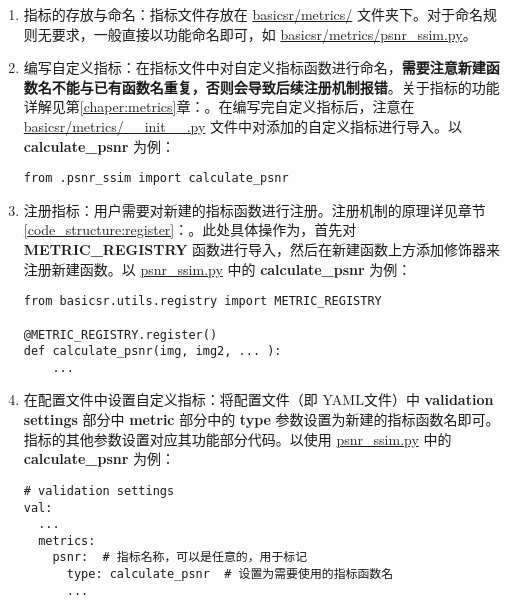 \documentclass[../main.tex]{subfiles}
\begin{document}
\begin{enumerate}[第 1 步]
    \item 指标的存放与命名：指标文件存放在 \href{https://github.com/XPixelGroup/BasicSR/tree/master/basicsr/metrics}{basicsr/metrics/} 文件夹下。对于命名规则无要求，一般直接以功能命名即可，如 \href{https://github.com/XPixelGroup/BasicSR/tree/master/basicsr/metrics/psnr_ssim.py}{basicsr/metrics/psnr\_ssim.py}。

    \item 编写自定义指标：在指标文件中对自定义指标函数进行命名，\textbf{需要注意新建函数名不能与已有函数名重复，否则会导致后续注册机制报错}。关于指标的功能详解见第\ref{chaper:metrics}章：。在编写完自定义指标后，注意在 \href{https://github.com/XPixelGroup/BasicSR/tree/master/basicsr/metrics/__init__.py}{basicsr/metrics/\_\_init\_\_.py} 文件中对添加的自定义指标进行导入。以 \textbf{calculate\_psnr} 为例：
\begin{verbatim}
from .psnr_ssim import calculate_psnr
\end{verbatim}

    \item 注册指标：用户需要对新建的指标函数进行注册。注册机制的原理详见章节\ref{code_structure:register}：。此处具体操作为，首先对 \textbf{METRIC\_REGISTRY} 函数进行导入，然后在新建函数上方添加修饰器来注册新建函数。以 \href{https://github.com/XPixelGroup/BasicSR/tree/master/basicsr/metrics/psnr_ssim.py}{psnr\_ssim.py} 中的 \textbf{calculate\_psnr} 为例：
\begin{verbatim}
from basicsr.utils.registry import METRIC_REGISTRY

@METRIC_REGISTRY.register()
def calculate_psnr(img, img2, ... ):
    ...
\end{verbatim}

    \item 在配置文件中设置自定义指标：将配置文件（即 YAML文件）中 \textbf{validation settings} 部分中 \textbf{metric} 部分中的  \textbf{type} 参数设置为新建的指标函数名即可。指标的其他参数设置对应其功能部分代码。以使用 \href{https://github.com/XPixelGroup/BasicSR/tree/master/basicsr/metrics/psnr_ssim.py}{psnr\_ssim.py} 中的 \textbf{calculate\_psnr} 为例：
\begin{verbatim}
# validation settings
val:
  ...
  metrics:
    psnr:  # 指标名称，可以是任意的，用于标记
      type: calculate_psnr  # 设置为需要使用的指标函数名
      ...
\end{verbatim}
\end{enumerate}
\end{document}
